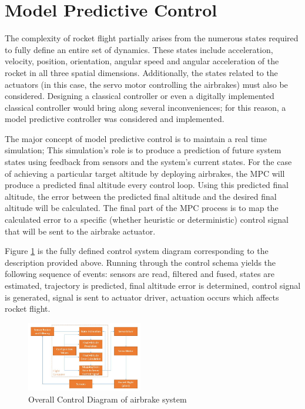 \documentclass[conference, letterpaper]{IEEEtran}
\begin{document}
\section{Model Predictive Control}

The complexity of rocket flight partially arises from the numerous states
required to fully define an entire set of dynamics. These states include
acceleration, velocity, position, orientation, angular speed and angular
acceleration of the rocket in all three spatial dimensions. Additionally,
the states related to the actuators (in this case, the servo motor controlling
the airbrakes) must also be considered. Designing a classical controller or even
a digitally implemented classical controller would bring along several
inconveniences; for this reason, a model predictive controller was considered
and implemented.

The major concept of model predictive control is to maintain a real time
simulation; This simulation's role is to produce a prediction of future system
states using feedback from sensors and the system's current states. For the case
of achieving a particular target altitude by deploying airbrakes, the MPC will
produce a predicted final altitude
every control loop. Using this predicted final altitude, the error between the
predicted final altitude and the desired final altitude will be calculated. The
final part of the MPC process is to map the calculated error to a specific
(whether heuristic or deterministic) control signal that will be sent to the
airbrake actuator.

Figure \ref{fig:MPC_diagram} is the fully defined control system diagram
corresponding to the description provided above. Running through the control
schema yields the following sequence of events: sensors are read, filtered and
fused, states are estimated, trajectory is predicted, final altitude error is
determined, control signal is generated, signal is sent to actuator driver,
actuation occurs which affects rocket flight.

\begin{figure}[H]
\centering
\includegraphics[width=0.45\textwidth]{./MPC_diagram}
\caption{Overall Control Diagram of airbrake system}
\label{fig:MPC_diagram}
\end{figure}
\end{document}
